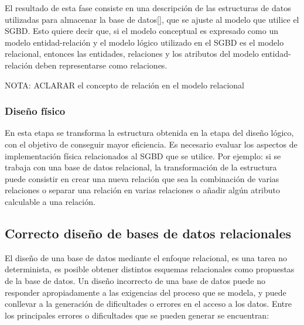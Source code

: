 El resultado de esta fase consiste en una descripción de las estructuras 
de datos utilizadas para almacenar la base de datos[\cite{db_book_cap3}], que se 
ajuste al modelo que utilice el SGBD. Esto quiere decir que,
si el modelo conceptual es expresado como un modelo 
entidad-relación y el modelo lógico utilizado en el SGBD es el modelo 
relacional, entonces las entidades, relaciones y los atributos del modelo entidad-relación
deben representarse como relaciones. 

NOTA: ACLARAR el concepto de relación en el modelo relacional



\subsubsection{Diseño físico}
En esta etapa se transforma la estructura obtenida en la etapa del diseño
lógico, con el objetivo de conseguir mayor eficiencia. Es necesario
evaluar los aspectos de implementación física relacionados al SGBD que se utilice.
Por ejemplo: si se trabaja con una base de datos relacional, la 
transformación de la estructura puede consistir en crear una nueva relación que 
sea la combinación de varias relaciones o separar una relación en varias relaciones o 
añadir algún atributo calculable a una relación. \\





\subsection{Correcto diseño de bases de datos relacionales}

El diseño de una base de datos mediante el enfoque relacional, es una 
tarea no determinista, es posible obtener distintos esquemas relacionales 
como propuestas de la base de datos.
Un diseño incorrecto de una base de datos puede no responder apropiadamente a las exigencias
del proceso que se modela, y puede conllevar a la generación de dificultades o 
errores en el acceso a los datos. Entre los principales errores o dificultades que se pueden generar
se encuentran:

